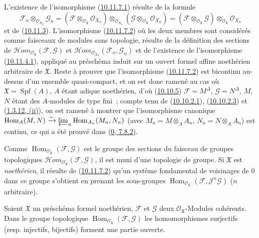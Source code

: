 L'existence de l'isomorphisme
(\hyperref[I.10.11.7.1-fr]{10.11.7.1}) résulte de la formule
\[
  \mathscr{F}_n\otimes_{\mathscr{O}_{X_n}}\mathscr{G}_n
  =
  (\mathscr{F}\otimes_{\mathscr{O}_{\mathfrak{X}}}
  \mathscr{O}_{X_n})
  \otimes_{\mathscr{O}_{X_n}}
  (\mathscr{G}\otimes_{\mathscr{O}_{\mathfrak{X}}}
  \mathscr{O}_{X_n})
  =
  (\mathscr{F}\otimes_{\mathscr{O}_{\mathfrak{X}}}\mathscr{G})
  \otimes_{\mathscr{O}_{\mathfrak{X}}}\mathscr{O}_{X_n}
\]
et de (\hyperref[I.10.11.3-fr]{10.11.3}). L'isomorphisme
(\hyperref[I.10.11.7.2-fr]{10.11.7.2}) où les deux membres sont
considérés comme faisceaux de modules sans topologie, résulte de la
définition des sections de
$\mathscr{H}\!om_{\mathscr{O}_{\mathfrak{X}}}
(\mathscr{F},\mathscr{G})$ et
$\mathscr{H}\!om_{\mathscr{O}_{X_n}}(\mathscr{F}_n,\mathscr{G}_n)$ et de
l'existence de l'isomorphisme
(\hyperref[I.10.11.4.1-fr]{10.11.4.1}), appliqué au préschéma induit sur
un ouvert formel affine noethérien arbitraire de $\mathfrak{X}$. Reste à
prouver que l'isomorphisme
(\hyperref[I.10.11.7.2-fr]{10.11.7.2}) est bicontinu au-dessus d'un
ensemble quasi-compact, et on est donc ramené au cas où
$\mathfrak{X}=\operatorname{Spf}(A)$, $A$ étant adique noethérien, d'où
(\hyperref[I.10.10.5-fr]{10.10.5})
$\mathscr{F}=M^\Delta$, $\mathscr{G}=N^\Delta$, $M$, $N$ étant des
$A$-modules de type fini~; compte tenu de
(\hyperref[I.10.10.2.1-fr]{10.10.2.1}),
(\hyperref[I.10.10.2.3-fr]{10.10.2.3}) et
(\hyperref[I.1.3.12-fr]{1.3.12, (ii)}), on est ramené à montrer que
l'isomorphisme canonique
$\operatorname{Hom}_A(M,N)\xrightarrow{\sim}
\varprojlim_n\operatorname{Hom}_{A_n}(M_n,N_n)$ (avec
$M_n=M\otimes_A A_n$, $N_n=N\otimes_A A_n$) est continu, ce qui a été
prouvé dans (\hyperref[0.7.8.2-fr]{0, 7.8.2}).

\begin{env}[10.11.8]
\label{I.10.11.8-fr}
Comme $\operatorname{Hom}_{\mathscr{O}_{\mathfrak{X}}}
(\mathscr{F},\mathscr{G})$ est le groupe des sections du faisceau de
groupes topologiques
$\mathscr{H}\!om_{\mathscr{O}_{\mathfrak{X}}}
(\mathscr{F},\mathscr{G})$, il est muni d'une topologie de groupe. Si
$\mathfrak{X}$ est \emph{noethérien}, il résulte de
(\hyperref[I.10.11.7.2-fr]{10.11.7.2}) qu'un système fondamental de
voisinages de $0$ dans ce groupe s'obtient en prenant les sous-groupes
$\operatorname{Hom}_{\mathscr{O}_{\mathfrak{X}}}
(\mathscr{F},\mathscr{J}^n\mathscr{G})$ ($n$ arbitraire).
\end{env}

\begin{proposition}[10.11.9]
\label{I.10.11.9-fr}
Soient $\mathfrak{X}$ un préschéma formel noethérien, $\mathscr{F}$ et
$\mathscr{G}$ deux $\mathscr{O}_{\mathfrak{X}}$-Modules cohérents. Dans
le groupe topologique
$\operatorname{Hom}_{\mathscr{O}_{\mathfrak{X}}}
(\mathscr{F},\mathscr{G})$ les homomorphismes surjectifs (resp.
injectifs, bijectifs) forment une partie ouverte.
\end{proposition}

